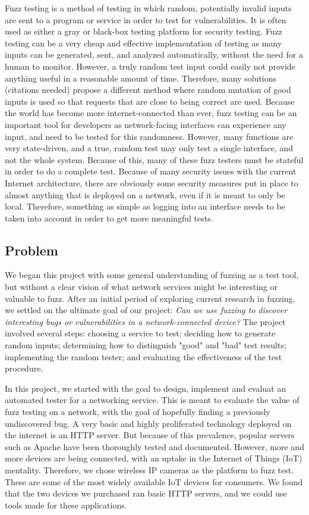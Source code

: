 \documentclass[letterpaper,twocolumn,10pt]{article}
\begin{document}
Fuzz testing is a method of testing in which random, potentially invalid inputs are sent to a program or service in order to test for vulnerabilities. It is often used as either a gray or black-box testing platform for security testing. Fuzz testing can be a very cheap and effective implementation of testing as many inputs can be generated, sent, and analyzed automatically, without the need for a human to monitor. However, a truly random test input could easily not provide anything useful in a reasonable amount of time. Therefore, many solutions (citations needed) propose a different method where random mutation of good inputs is used so that requests that are close to being correct are used. 
Because the world has become more internet-connected than ever, fuzz testing can be an important tool for developers as network-facing interfaces can experience any input, and need to be tested for this randomness. However, many functions are very state-driven, and a true, random test may only test a single interface, and not the whole system. Because of this, many of these fuzz testers must be stateful in order to do a complete test. Because of many security issues with the current Internet architecture, there are obviously some security measures put in place to almost anything that is deployed on a network, even if it is meant to only be local. Therefore, something as simple as logging into an interface needs to be taken into account in order to get more meaningful tests.

\subsection{Problem}
We began this project with some general understanding of fuzzing as a test tool, but without a clear vision of what network services might be interesting or valuable to fuzz. After an initial period of exploring current research in fuzzing, we settled on the ultimate goal of our project: \textit{Can we use fuzzing to discover interesting bugs or vulnerabilities in a network-connected device?} The project involved several steps: choosing a service to test; deciding how to generate random inputs; determining how to distinguish "good" and "bad" test results; implementing the random tester; and evaluating the effectiveness of the test procedure. 

In this project, we started with the goal to design, implement and evaluat an automated tester for a networking service. This is meant to evaluate the value of fuzz testing on a network, with the goal of hopefully finding a previously undiscovered bug. A very basic and highly proliferated technology deployed on the internet is an HTTP server. But because of this prevalence, popular servers such as Apache have been thoroughly tested and documented. However, more and more devices are being connected, with an uptake in the Internet of Things (IoT) mentality. Therefore, we chose wireless IP cameras as the platform to fuzz test. These are some of the most widely available IoT devices for consumers. We found that the two devices we purchased ran basic HTTP servers, and we could use tools made for these applications. 
\end{document}
